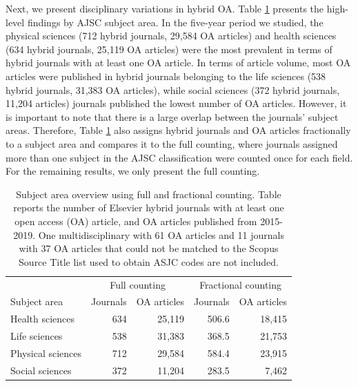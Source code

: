 \documentclass[a4paper,man,floatsintext,longtable,noextraspace,12pt]{apa6}
\begin{document}
Next, we present disciplinary variations in hybrid OA. Table
\ref{tab:subject_area_table} presents the high-level findings by AJSC
subject area. In the five-year period we studied, the physical sciences
(712 hybrid journals, 29,584 OA articles) and health sciences (634
hybrid journals, 25,119 OA articles) were the most prevalent in terms of
hybrid journals with at least one OA article. In terms of article
volume, most OA articles were published in hybrid journals belonging to
the life sciences (538 hybrid journals, 31,383 OA articles), while
social sciences (372 hybrid journals, 11,204 articles) journals
published the lowest number of OA articles. However, it is important to
note that there is a large overlap between the journals' subject areas.
Therefore, Table \ref{tab:subject_area_table} also assigns hybrid
journals and OA articles fractionally to a subject area and compares it
to the full counting, where journals assigned more than one subject in
the AJSC classification were counted once for each field. For the
remaining results, we only present the full counting.

\begin{table}

\caption{\label{tab:subject_area_table}Subject area overview using full and fractional counting. Table reports the number of Elsevier hybrid journals with at least one open access (OA) article, and OA articles published from 2015-2019. One multidisciplinary with 61 OA articles and 11 journals with 37 OA articles that  could not be matched to the Scopus Source Title list used to obtain ASJC codes are not included.}
\centering
\begin{tabular}[t]{lrrrr}
\toprule
\multicolumn{1}{c}{ } & \multicolumn{2}{c}{Full counting} & \multicolumn{2}{c}{Fractional counting} \\
\cmidrule(l{3pt}r{3pt}){2-3} \cmidrule(l{3pt}r{3pt}){4-5}
Subject area & Journals & OA articles & Journals & OA articles\\
\midrule
Health sciences & 634 & 25,119 & 506.6 & 18,415\\
Life sciences & 538 & 31,383 & 368.5 & 21,753\\
Physical sciences & 712 & 29,584 & 584.4 & 23,915\\
Social sciences & 372 & 11,204 & 283.5 & 7,462\\
\bottomrule
\end{tabular}
\end{table}
\end{document}
